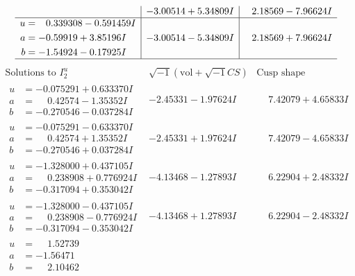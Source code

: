 \documentclass[1p]{elsarticle_modified}
\theoremstyle{definition}
\newcommand{\I}{\sqrt{-1}}
\begin{document}
$$\begin{array}{c|c|c}
 & -3.00514 + 5.34809 I & \phantom{-}2.18569 - 7.96624 I \\ \hline\begin{aligned}
u &= \phantom{-}0.339308 - 0.591459 I \\
a &= -0.59919 + 3.85196 I \\
b &= -1.54924 - 0.17925 I\end{aligned}
 & -3.00514 - 5.34809 I & \phantom{-}2.18569 + 7.96624 I\\
 \hline 
 \end{array}$$\newpage$$\begin{array}{c|c|c}  
\text{Solutions to }I^u_{2}& \I (\text{vol} + \sqrt{-1}CS) & \text{Cusp shape}\\
 \hline 
\begin{aligned}
u &= -0.075291 + 0.633370 I \\
a &= \phantom{-}0.42574 - 1.35352 I \\
b &= -0.270546 - 0.037284 I\end{aligned}
 & -2.45331 - 1.97624 I & \phantom{-}7.42079 + 4.65833 I \\ \hline\begin{aligned}
u &= -0.075291 - 0.633370 I \\
a &= \phantom{-}0.42574 + 1.35352 I \\
b &= -0.270546 + 0.037284 I\end{aligned}
 & -2.45331 + 1.97624 I & \phantom{-}7.42079 - 4.65833 I \\ \hline\begin{aligned}
u &= -1.328000 + 0.437105 I \\
a &= \phantom{-}0.238908 + 0.776924 I \\
b &= -0.317094 + 0.353042 I\end{aligned}
 & -4.13468 - 1.27893 I & \phantom{-}6.22904 + 2.48332 I \\ \hline\begin{aligned}
u &= -1.328000 - 0.437105 I \\
a &= \phantom{-}0.238908 - 0.776924 I \\
b &= -0.317094 - 0.353042 I\end{aligned}
 & -4.13468 + 1.27893 I & \phantom{-}6.22904 - 2.48332 I \\ \hline\begin{aligned}
u &= \phantom{-}1.52739\phantom{ +0.000000I} \\
a &= -1.56471\phantom{ +0.000000I} \\
b &= \phantom{-}2.10462\phantom{ +0.000000I}\end{aligned}

\end{array}$$
\end{document}
